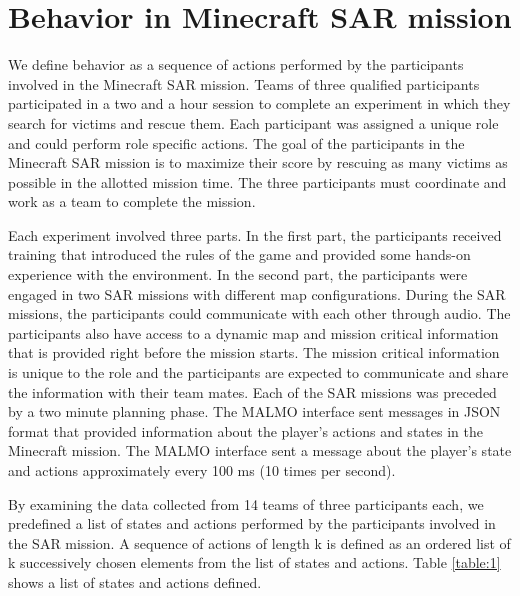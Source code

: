\documentclass{article}
\begin{document}
\section*{Behavior in Minecraft SAR mission}
We define behavior as a sequence of actions performed by the participants 
involved in the Minecraft SAR mission. Teams of three qualified participants
participated in a two and a hour session to complete an experiment in which 
they search for victims and rescue them. Each participant was assigned a unique role
and could perform role specific actions. The goal of the participants in the Minecraft
SAR mission is to maximize their score by rescuing as many victims as possible in the
allotted mission time. The three participants must coordinate and work as a team to
complete the mission.

Each experiment involved three parts. In the first part, the participants received
training that introduced the rules of the game and provided some
hands-on experience with the environment. In the second part, the participants 
were engaged in two SAR missions with different map configurations. During the SAR
missions, the participants could communicate with each other through audio. The
participants also have access to a dynamic map and mission critical information that
is provided right before the mission starts. The mission critical information is unique
to the role and the participants are expected to communicate and share the information
with their team mates. Each of the SAR missions was preceded by a two minute planning
phase. The MALMO interface sent messages in JSON format that provided information about
the player's actions and states in the Minecraft mission. The MALMO interface sent 
a message about the player's state and actions approximately every 100 ms 
(10 times per second).

By examining the data collected from 14 teams of three participants each, we predefined
a list of states and actions performed by the participants involved in the SAR mission.
A sequence of actions of length k is defined as an ordered list of k successively chosen
elements from the list of states and actions. Table \ref{table:1} shows a list of states
and actions defined.
\end{document}
